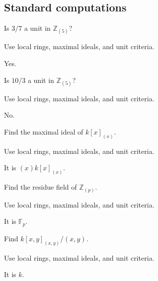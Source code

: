 \subsection*{Standard computations}

\begin{exercise}\label{exr:v08-expand-01}
Is $3/7$ a unit in $\mathbb Z_{(5)}$?
\end{exercise}
\begin{hint}
Use local rings, maximal ideals, and unit criteria.
\end{hint}
\begin{solution}
Yes.
\end{solution}

\begin{exercise}\label{exr:v08-expand-02}
Is $10/3$ a unit in $\mathbb Z_{(5)}$?
\end{exercise}
\begin{hint}
Use local rings, maximal ideals, and unit criteria.
\end{hint}
\begin{solution}
No.
\end{solution}

\begin{exercise}\label{exr:v08-expand-03}
Find the maximal ideal of $k[x]_{(x)}$.
\end{exercise}
\begin{hint}
Use local rings, maximal ideals, and unit criteria.
\end{hint}
\begin{solution}
It is $(x)k[x]_{(x)}$.
\end{solution}

\begin{exercise}\label{exr:v08-expand-04}
Find the residue field of $\mathbb Z_{(p)}$.
\end{exercise}
\begin{hint}
Use local rings, maximal ideals, and unit criteria.
\end{hint}
\begin{solution}
It is $\mathbb F_p$.
\end{solution}

\begin{exercise}\label{exr:v08-expand-05}
Find $k[x,y]_{(x,y)}/(x,y)$.
\end{exercise}
\begin{hint}
Use local rings, maximal ideals, and unit criteria.
\end{hint}
\begin{solution}
It is $k$.
\end{solution}

